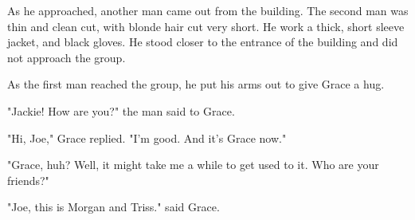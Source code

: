 \documentclass[courier]{sffms}
\begin{document}
As he approached, another man came out from the
building. The second man was thin and clean cut,
with blonde hair cut very short. He work a thick,
short sleeve jacket, and black gloves. He stood closer
to the entrance of the building and did not approach
the group.

As the first man reached the group, he put his arms
out to give Grace a hug.

"Jackie! How are you?" the man said to Grace.

"Hi, Joe," Grace replied. "I'm good. And it's Grace now."

"Grace, huh? Well, it might take me a while to get
used to it. Who are your friends?"

"Joe, this is Morgan and Triss." said Grace.
\end{document}
